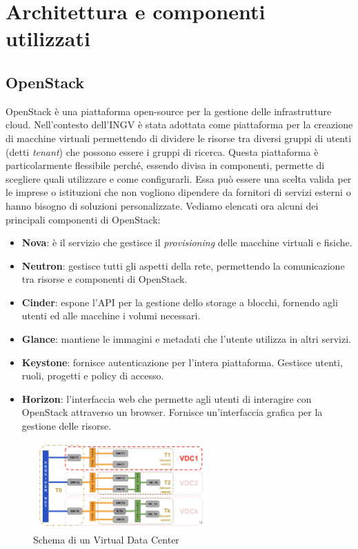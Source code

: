 \documentclass[12pt,a4paper,openright,twoside]{book}
\begin{document}
\chapter{Architettura e componenti utilizzati}
\section{OpenStack}
OpenStack è una piattaforma open-source per la gestione delle infrastrutture cloud. Nell'contesto dell'INGV è stata adottata come piattaforma per la creazione di
macchine virtuali permettendo di dividere le risorse tra diversi gruppi di utenti (detti \textit{tenant}) che possono essere i gruppi di ricerca.
Questa piattaforma è particolarmente flessibile perché, essendo divisa in componenti, permette di scegliere quali utilizzare e come configurarli. Essa può essere
una scelta valida per le imprese o istituzioni che non vogliono dipendere da fornitori di servizi esterni o hanno bisogno di soluzioni personalizzate.
Vediamo elencati ora alcuni dei principali componenti di OpenStack\cite{amslaurea29330}:
%
%
\begin{itemize}
    \item \textbf{Nova}: è il servizio che gestisce il \textit{provisioning} delle macchine virtuali e fisiche. 
    \item \textbf{Neutron}: gestisce tutti gli aspetti della rete, permettendo la comunicazione tra risorse e componenti di OpenStack. 
    \item \textbf{Cinder}: espone l'API per la gestione dello storage a blocchi, fornendo agli utenti ed alle macchine i volumi necessari.
    \item \textbf{Glance}: mantiene le immagini e metadati che l'utente utilizza in altri servizi. 
    \item \textbf{Keystone}: fornisce autenticazione per l'intera piattaforma. Gestisce utenti, ruoli, progetti e policy di accesso.
    \item \textbf{Horizon}: l'interfaccia web che permette agli utenti di interagire con OpenStack attraverso un browser. Fornisce un'interfaccia grafica per la gestione delle risorse.
\end{itemize}
\begin{figure}
    \centering
    \includegraphics[width=0.6\textwidth]{figures/vdc-diagram.png}
    \caption{Schema di un Virtual Data Center}
    \label{fig:vdc}
\end{figure}
\end{document}
